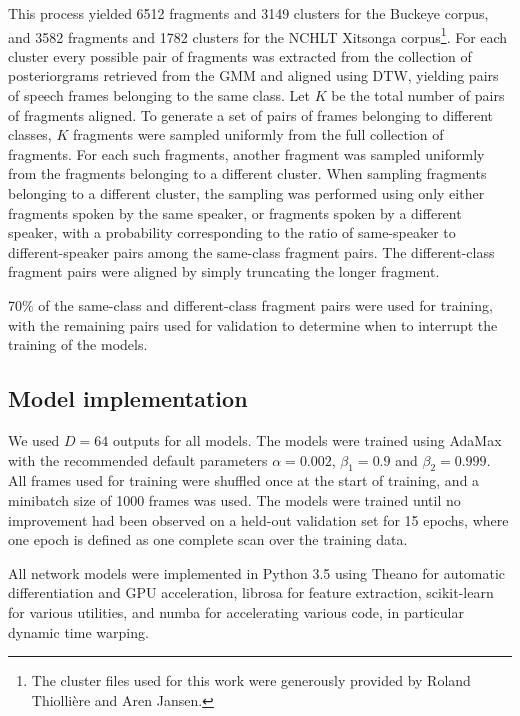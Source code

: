 This process yielded 6512 fragments and 3149 clusters for the Buckeye corpus, and 3582 fragments and 1782 clusters for the NCHLT Xitsonga corpus\footnote{The cluster files used for this work were generously provided by Roland Thiollière and Aren Jansen.}.
For each cluster every possible pair of fragments was extracted from the collection of posteriorgrams retrieved from the GMM and aligned using DTW, yielding pairs of speech frames belonging to the same class.
Let $K$ be the total number of pairs of fragments aligned.
To generate a set of pairs of frames belonging to different classes, $K$ fragments were sampled uniformly from the full collection of fragments.
For each such fragments, another fragment was sampled uniformly from the fragments belonging to a different cluster.
When sampling fragments belonging to a different cluster, the sampling was performed using only either fragments spoken by the same speaker, or fragments spoken by a different speaker, with a probability corresponding to the ratio of same-speaker to different-speaker pairs among the same-class fragment pairs.
The different-class fragment pairs were aligned by simply truncating the longer fragment.

70\% of the same-class and different-class fragment pairs were used for training, with the remaining pairs used for validation to determine when to interrupt the training of the models.

\subsection{Model implementation}

We used $D = 64$ outputs for all models.
The models were trained using AdaMax \parencite{kingma2014adam} with the recommended default parameters $\alpha = 0.002$, $\beta_1 = 0.9$ and $\beta_2 = 0.999$.
All frames used for training were shuffled once at the start of training, and a minibatch size of 1000 frames was used.
The models were trained until no improvement had been observed on a held-out validation set for 15 epochs, where one epoch is defined as one complete scan over the training data.

All network models were implemented in Python 3.5 using Theano \parencite{theano} for automatic differentiation and GPU acceleration, librosa \parencite{librosa} for feature extraction, scikit-learn \parencite{scikit-learn} for various utilities, and numba \parencite{numba} for accelerating various code, in particular dynamic time warping.

